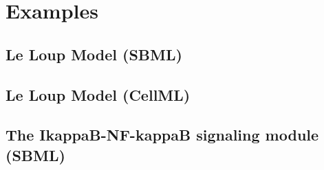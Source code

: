 \chapter{Examples}

\section{Le Loup Model (SBML)}


\section{Le Loup Model (CellML)}


\newpage
\section{The IkappaB-NF-kappaB signaling module (SBML)}
